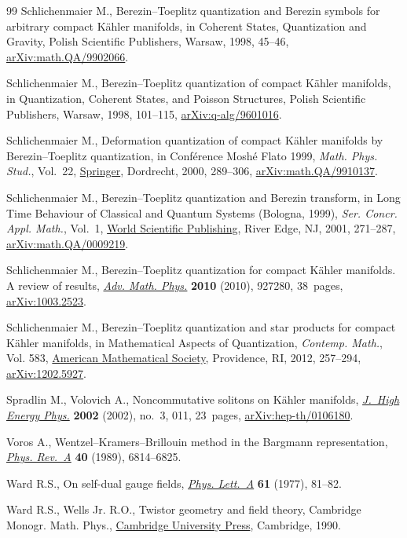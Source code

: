 \documentclass[10pt,a4paper]{amsart}
\numberwithin{equation}{section}
\begin{document}
\begin{thebibliography}{99}
Schlichenmaier M., Berezin--{T}oeplitz quantization and Berezin symbols for
 arbitrary compact K\"{a}hler manifolds, in Coherent {S}tates, {Q}uantization
 and {G}ravity, Polish Scientific Publishers, Warsaw, 1998, 45--46,
 \href{http://arxiv.org/abs/math.QA/9902066}{arXiv:math.QA/9902066}.

Schlichenmaier M., Berezin--{T}oeplitz quantization of compact {K}\"ahler
 manifolds, in Quantization, {C}oherent {S}tates, and {P}oisson {S}tructures,
 Polish Scientific Publishers, Warsaw, 1998, 101--115,
 \href{http://arxiv.org/abs/q-alg/9601016}{arXiv:q-alg/9601016}.

Schlichenmaier M., Deformation quantization of compact {K}\"ahler manifolds by
 {B}erezin--{T}oeplitz quantization, in Conf\'{e}rence Mosh\'{e} Flato 1999,
 \textit{Math. Phys. Stud.}, Vol.~22,
 \href{https://doi.org/10.1007/978-94-015-1276-3_22}{Springer}, Dordrecht,
 2000, 289--306,
 \href{http://arxiv.org/abs/math.QA/9910137}{arXiv:math.QA/9910137}.

Schlichenmaier M., Berezin--{T}oeplitz quantization and {B}erezin transform, in
 Long {T}ime {B}ehaviour of {C}lassical and {Q}uantum {S}ystems ({B}ologna,
 1999), \textit{Ser. Concr. Appl. Math.}, Vol.~1,
 \href{https://doi.org/10.1142/9789812794598_0015}{World Scientific
 Publishing}, River Edge, NJ, 2001, 271--287,
 \href{http://arxiv.org/abs/math.QA/0009219}{arXiv:math.QA/0009219}.

Schlichenmaier M., Berezin--{T}oeplitz quantization for compact {K}\"ahler
 manifolds. {A} review of results,
 \href{https://doi.org/10.1155/2010/927280}{\textit{Adv. Math. Phys.}}
 \textbf{2010} (2010), 927280, 38~pages,
 \href{http://arxiv.org/abs/1003.2523}{arXiv:1003.2523}.

Schlichenmaier M., Berezin--{T}oeplitz quantization and star products for
 compact {K}\"ahler manifolds, in Mathematical {A}spects of {Q}uantization,
 \textit{Contemp. Math.}, Vol. 583,
 \href{https://doi.org/10.1090/conm/583/11573}{American Mathematical Society},
 Providence, RI, 2012, 257--294,
 \href{http://arxiv.org/abs/1202.5927}{arXiv:1202.5927}.

Spradlin M., Volovich A., Noncommutative solitons on {K}\"ahler manifolds,
 \href{https://doi.org/10.1088/1126-6708/2002/03/011}{\textit{J.~High Energy
 Phys.}} \textbf{2002} (2002), no.~3, 011, 23~pages,
 \href{http://arxiv.org/abs/hep-th/0106180}{arXiv:hep-th/0106180}.

Voros A., Wentzel--{K}ramers--{B}rillouin method in the {B}argmann
 representation, \href{https://doi.org/10.1103/PhysRevA.40.6814}{\textit{Phys.
 Rev.~A}} \textbf{40} (1989), 6814--6825.

Ward R.S., On self-dual gauge fields,
 \href{https://doi.org/10.1016/0375-9601(77)90842-8}{\textit{Phys. Lett.~A}}
 \textbf{61} (1977), 81--82.

Ward R.S., Wells Jr. R.O., Twistor geometry and field theory, Cambridge Monogr.
 Math. Phys., \href{https://doi.org/10.1017/CBO9780511524493}{Cambridge
 University Press}, Cambridge, 1990.

\end{thebibliography}
\end{document}
